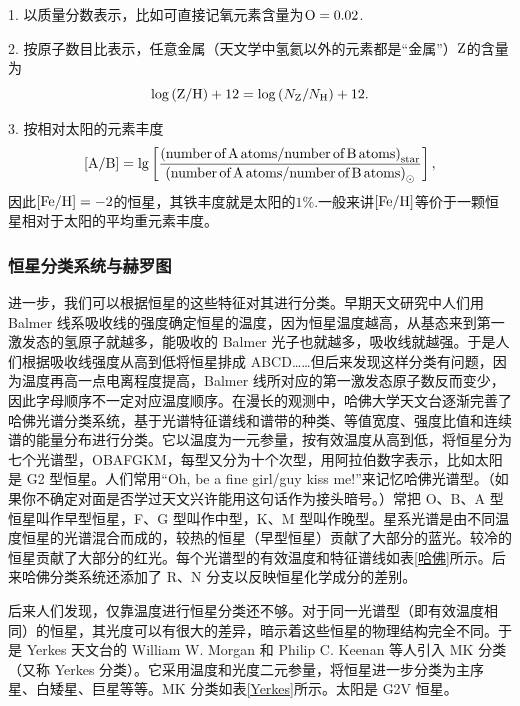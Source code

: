 \documentclass[../天体物理基础.tex]{subfiles}
\begin{document}
1. 以质量分数表示，比如可直接记氧元素含量为$\ce{O}=0.02$.

2. 按原子数目比表示，任意金属（天文学中氢氦以外的元素都是“金属”）$\ce{Z}$的含量为
\begin{equation}
\log\left(\ce{Z}/\ce{H}\right)+12=\log\left(N_{\ce{Z}}/N_{\ce{H}}\right)+12.
\end{equation}

3. 按相对太阳的元素丰度
\begin{equation}
\left[\ce{A}/\ce{B}\right]=\lg\left[\frac{\left(\textrm{number\,of\,A\,atoms/number\,of\,B\,atoms}\right)_{\text{star}}}{\left(\textrm{number\,of\,A\,atoms/number\,of\,B\,atoms}\right)_{\odot}}\right],
\end{equation}
因此$\left[\ce{Fe/H}\right]=-2$的恒星，其铁丰度就是太阳的$1\%$.一般来讲$\left[\ce{Fe/H}\right]$等价于一颗恒星相对于太阳的平均重元素丰度。

\subsubsection{恒星分类系统与赫罗图}
进一步，我们可以根据恒星的这些特征对其进行分类。早期天文研究中人们用 Balmer 线系吸收线的强度确定恒星的温度，因为恒星温度越高，从基态来到第一激发态的氢原子就越多，能吸收的 Balmer 光子也就越多，吸收线就越强。于是人们根据吸收线强度从高到低将恒星排成 ABCD……但后来发现这样分类有问题，因为温度再高一点电离程度提高，Balmer 线所对应的第一激发态原子数反而变少，因此字母顺序不一定对应温度顺序。在漫长的观测中，哈佛大学天文台逐渐完善了哈佛光谱分类系统，基于光谱特征谱线和谱带的种类、等值宽度、强度比值和连续谱的能量分布进行分类。它以温度为一元参量，按有效温度从高到低，将恒星分为七个光谱型，OBAFGKM，每型又分为十个次型，用阿拉伯数字表示，比如太阳是 G2 型恒星。人们常用``Oh, be a fine girl/guy kiss me!''来记忆哈佛光谱型。（如果你不确定对面是否学过天文兴许能用这句话作为接头暗号。）常把 O、B、A 型恒星叫作早型恒星，F、G 型叫作中型，K、M 型叫作晚型。星系光谱是由不同温度恒星的光谱混合而成的，较热的恒星（早型恒星）贡献了大部分的蓝光。较冷的恒星贡献了大部分的红光。每个光谱型的有效温度和特征谱线如表\ref{哈佛}所示。后来哈佛分类系统还添加了 R、N 分支以反映恒星化学成分的差别。

后来人们发现，仅靠温度进行恒星分类还不够。对于同一光谱型（即有效温度相同）的恒星，其光度可以有很大的差异，暗示着这些恒星的物理结构完全不同。于是 Yerkes 天文台的 William W. Morgan 和 Philip C. Keenan 等人引入 MK 分类（又称 Yerkes 分类）。它采用温度和光度二元参量，将恒星进一步分类为主序星、白矮星、巨星等等。MK 分类如表\ref{Yerkes}所示。太阳是 G2V 恒星。
\end{document}

